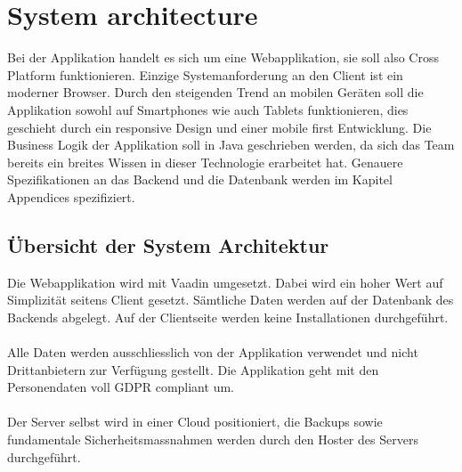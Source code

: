 \chapter{System architecture}
Bei der Applikation handelt es sich um eine Webapplikation, sie soll also \gls{Cross Platform} funktionieren. Einzige Systemanforderung an den Client ist ein moderner Browser. Durch den steigenden Trend an mobilen Ger\"{a}ten soll die Applikation sowohl auf Smartphones wie auch Tablets funktionieren, dies geschieht durch ein \gls{responsive Design} und einer \gls{mobile first} Entwicklung. Die Business Logik der Applikation soll in Java geschrieben werden, da sich das Team bereits ein breites Wissen in dieser Technologie erarbeitet hat. Genauere Spezifikationen an das Backend und die Datenbank werden im Kapitel Appendices spezifiziert.

\section{\"{U}bersicht der System Architektur}

Die Webapplikation wird mit \gls{Vaadin} umgesetzt. Dabei wird ein hoher Wert auf Simplizit\"{a}t seitens Client gesetzt. S\"{a}mtliche Daten werden auf der Datenbank des Backends abgelegt. Auf der Clientseite werden keine Installationen durchgef\"{u}hrt. \\ \\
Alle Daten werden ausschliesslich von der Applikation verwendet und nicht Drittanbietern zur Verf\"{u}gung gestellt. Die Applikation geht mit den Personendaten voll \gls{GDPR compliant} um. \\ \\
Der Server selbst wird in einer Cloud positioniert, die Backups sowie fundamentale Sicherheitsmassnahmen werden durch den Hoster des Servers durchgef\"{u}hrt.
